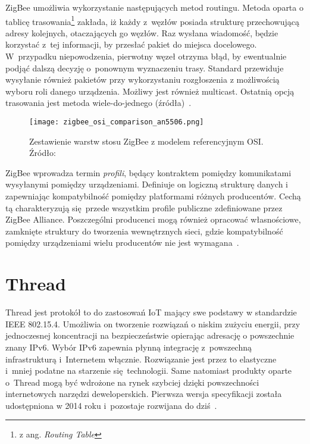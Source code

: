 ZigBee umożliwia wykorzystanie następujących metod routingu. Metoda oparta o tablicę trasowania\footnote{z ang. \textit{Routing Table}}
zakłada, iż każdy z~węzłów posiada strukturę przechowującą adresy kolejnych, otaczających go węzłów. Raz wysłana wiadomość,
będzie korzystać z~tej informacji, by przesłać pakiet do miejsca docelowego. W~przypadku niepowodzenia, pierwotny węzeł otrzyma
błąd, by ewentualnie podjąć dalszą decyzję o~ponownym wyznaczeniu trasy. Standard przewiduje wysyłanie również pakietów
przy wykorzystaniu rozgłoszenia z możliwością wyboru roli danego urządzenia. Możliwy jest również multicast. Ostatnią
opcją trasowania jest metoda wiele-do-jednego (źródła)~\cite{silicon_laboratories_ug10302_2021}.

\begin{figure}[!ht]
	\centering \texttt{[image: zigbee\_osi\_comparison\_an5506.png]}
	\caption{Zestawienie warstw stosu ZigBee z modelem referencyjnym OSI. Źródło:~\cite{stmicroelectronics_an5506_2020}}
	\label{rys:zigbee_osi_comparison_an5506}
\end{figure}

ZigBee wprowadza termin \textit{profili}, będący kontraktem pomiędzy komunikatami wysyłanymi pomiędzy urządzeniami. Definiuje on
logiczną strukturę danych i zapewniając kompatybilność pomiędzy platformami różnych producentów. Cechą tą charakteryzują
się przede wszystkim profile publiczne zdefiniowane przez ZigBee Alliance. Poszczególni producenci mogą 
również opracować własnościowe, zamknięte struktury do tworzenia wewnętrznych sieci, gdzie kompatybilność pomiędzy
urządzeniami wielu producentów nie jest wymagana~\cite{zigbee_alliance_zigbee_2017, stmicroelectronics_an5506_2020, zigbee_alliance_zigbee_2017}.

\section{Thread}
Thread jest protokół to do zastosowań \gls{IoT} mający swe podstawy w standardzie IEEE 802.15.4.
Umożliwia on tworzenie rozwiązań o niskim zużyciu energii, przy jednoczesnej koncentracji na bezpieczeństwie opierając
adresację o powszechnie znany IPv6. Wybór IPv6 zapewnia płynną integrację z~powszechną infrastrukturą
i~Internetem włącznie. Rozwiązanie jest przez to elastyczne i~mniej podatne na starzenie się technologii.
Same natomiast produkty oparte o~Thread mogą być wdrożone na rynek szybciej dzięki powszechności
internetowych narzędzi deweloperskich. Pierwsza wersja specyfikacji została udostępniona
w 2014 roku i~pozostaje rozwijana do dziś~\cite{noauthor_thread_nodate}.

